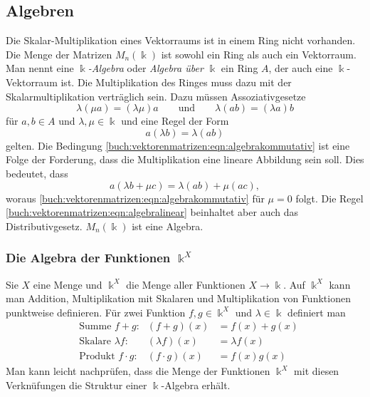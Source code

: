 %
%
%
\subsection{Algebren
\label{buch:grundlagen:subsection:algebren}}
Die Skalar-Multiplikation eines Vektorraums ist in einem Ring nicht
vorhanden.
Die Menge der Matrizen $M_n(\Bbbk)$ ist sowohl ein Ring als auch
ein Vektorraum.
Man nennt eine {\em $\Bbbk$-Algebra} oder {\em Algebra über $\Bbbk$}
ein Ring $A$, der auch eine $\Bbbk$-Vektorraum ist.
Die Multiplikation des Ringes muss dazu mit der Skalarmultiplikation
verträglich sein.
Dazu müssen Assoziativgesetze
\[
\lambda(\mu a) = (\lambda \mu) a
\qquad\text{und}\qquad
\lambda(ab) = (\lambda a) b
\]
für $a,b\in A$ und $\lambda,\mu\in\Bbbk$
und eine Regel der Form
\begin{equation}
a(\lambda b) = \lambda (ab)
\label{buch:vektorenmatrizen:eqn:algebrakommutativ}
\end{equation}
gelten.
Die Bedingung \eqref{buch:vektorenmatrizen:eqn:algebrakommutativ} ist
eine Folge der Forderung, dass die Multiplikation 
eine lineare Abbildung sein soll.
Dies bedeutet, dass
\begin{equation}
a(\lambda b+\mu c) = \lambda (ab) + \mu (ac),
\label{buch:vektorenmatrizen:eqn:algebralinear}
\end{equation}
woraus 
\eqref{buch:vektorenmatrizen:eqn:algebrakommutativ}
für $\mu=0$ folgt.
Die Regel \eqref{buch:vektorenmatrizen:eqn:algebralinear}
beinhaltet aber auch das Distributivgesetz.
$M_n(\Bbbk)$ ist eine Algebra.

\subsubsection{Die Algebra der Funktionen $\Bbbk^X$}
Sie $X$ eine Menge und $\Bbbk^X$ die Menge aller Funktionen $X\to \Bbbk$.
Auf $\Bbbk^X$ kann man Addition, Multiplikation mit Skalaren und
Multiplikation von Funktionen punktweise definieren.
Für zwei Funktion $f,g\in\Bbbk^X$ und $\lambda\in\Bbbk$ definiert man
\[
\begin{aligned}
&\text{Summe $f+g$:}
&
(f+g)(x) &= f(x)+g(x)
\\
&\text{Skalare $\lambda f$:}
&
(\lambda f)(x) &= \lambda f(x)
\\
&\text{Produkt $f\cdot g$:}
&
(f\cdot g)(x) &= f(x) g(x)
\end{aligned}
\]
Man kann leicht nachprüfen, dass die Menge der Funktionen $\Bbbk^X$
mit diesen Verknüfungen die Struktur einer $\Bbbk$-Algebra erhält.

